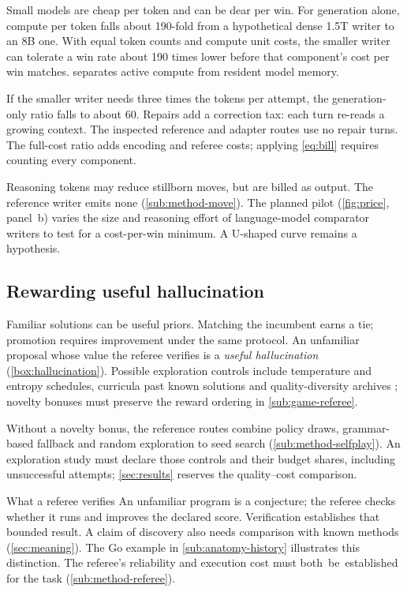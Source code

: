 Small models are cheap per token and can be dear per win. For generation
alone, compute per token falls about 190-fold from a hypothetical dense 1.5T writer to
an 8B one. With equal token counts and compute unit costs, the smaller
writer can tolerate a win rate about 190 times lower before that
component's cost per win matches.  separates active
compute from resident model memory.

If the smaller writer needs three times the tokens per
attempt, the generation-only ratio falls to about 60. Repairs add a
correction tax: each turn re-reads a growing context. The inspected
reference and adapter routes use no repair turns. The full-cost ratio adds encoding and referee costs; applying
\cref{eq:bill} requires counting every component.

Reasoning tokens may reduce stillborn moves, but are billed as output.
The reference writer emits none (\cref{sub:method-move}). The planned pilot
(\cref{fig:price}, panel~b) varies the size and reasoning effort of language-model comparator writers to test
for a cost-per-win minimum. A U-shaped curve remains a hypothesis.

\subsection{Rewarding useful hallucination}\label{sub:price-hallucination}

Familiar solutions can be useful priors. Matching the incumbent earns a
tie; promotion requires improvement under the same protocol. An unfamiliar
proposal whose value the referee verifies is a \emph{useful hallucination}
(\cref{box:hallucination}). Possible exploration controls include temperature
and entropy schedules, curricula past known solutions and quality-diversity
archives \citep{lehman2011novelty,mouret2015mapelites}; novelty bonuses must
preserve the reward ordering in \cref{sub:game-referee}.

Without a novelty bonus, the reference routes combine policy draws,
grammar-based fallback and random exploration to seed search
(\cref{sub:method-selfplay}). An exploration study must declare those
controls and their budget shares, including unsuccessful attempts;
\cref{sec:results} reserves the quality--cost comparison.

\begin{explainer}[label=box:hallucination]{What a referee verifies}
  An unfamiliar program is a conjecture; the referee checks whether it
  runs and improves the declared score. Verification establishes that
  bounded result. A claim of discovery also needs comparison with known
  methods (\cref{sec:meaning}). The Go example in
  \cref{sub:anatomy-history} illustrates this distinction. The referee's
  reliability and execution cost must \mbox{both be established} for the task
  (\cref{sub:method-referee}).
\end{explainer}

